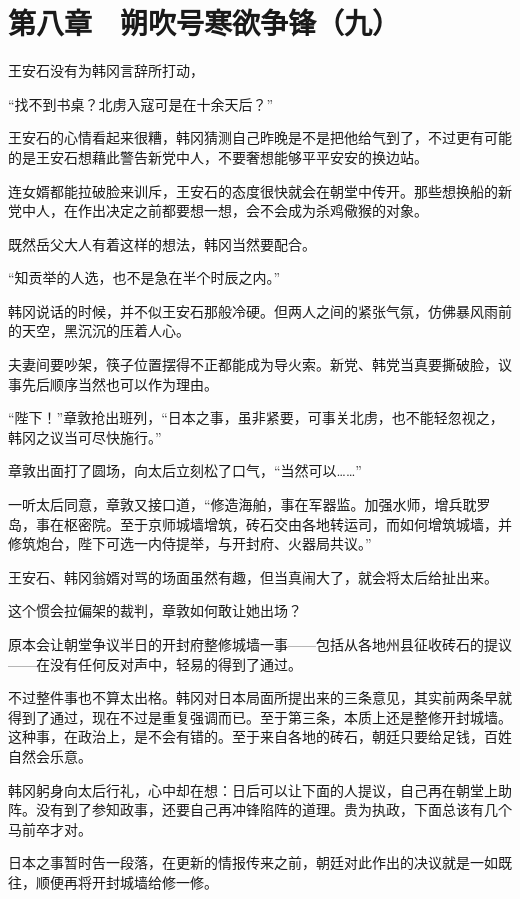\section{第八章　朔吹号寒欲争锋（九）}

王安石没有为韩冈言辞所打动，

“找不到书桌？北虏入寇可是在十余天后？”

王安石的心情看起来很糟，韩冈猜测自己昨晚是不是把他给气到了，不过更有可能的是王安石想藉此警告新党中人，不要奢想能够平平安安的换边站。

连女婿都能拉破脸来训斥，王安石的态度很快就会在朝堂中传开。那些想换船的新党中人，在作出决定之前都要想一想，会不会成为杀鸡儆猴的对象。

既然岳父大人有着这样的想法，韩冈当然要配合。

“知贡举的人选，也不是急在半个时辰之内。”

韩冈说话的时候，并不似王安石那般冷硬。但两人之间的紧张气氛，仿佛暴风雨前的天空，黑沉沉的压着人心。

夫妻间要吵架，筷子位置摆得不正都能成为导火索。新党、韩党当真要撕破脸，议事先后顺序当然也可以作为理由。

“陛下！”章敦抢出班列，“日本之事，虽非紧要，可事关北虏，也不能轻忽视之，韩冈之议当可尽快施行。”

章敦出面打了圆场，向太后立刻松了口气，“当然可以……”

一听太后同意，章敦又接口道，“修造海舶，事在军器监。加强水师，增兵耽罗岛，事在枢密院。至于京师城墙增筑，砖石交由各地转运司，而如何增筑城墙，并修筑炮台，陛下可选一内侍提举，与开封府、火器局共议。”

王安石、韩冈翁婿对骂的场面虽然有趣，但当真闹大了，就会将太后给扯出来。

这个惯会拉偏架的裁判，章敦如何敢让她出场？

原本会让朝堂争议半日的开封府整修城墙一事——包括从各地州县征收砖石的提议——在没有任何反对声中，轻易的得到了通过。

不过整件事也不算太出格。韩冈对日本局面所提出来的三条意见，其实前两条早就得到了通过，现在不过是重复强调而已。至于第三条，本质上还是整修开封城墙。这种事，在政治上，是不会有错的。至于来自各地的砖石，朝廷只要给足钱，百姓自然会乐意。

韩冈躬身向太后行礼，心中却在想：日后可以让下面的人提议，自己再在朝堂上助阵。没有到了参知政事，还要自己再冲锋陷阵的道理。贵为执政，下面总该有几个马前卒才对。

日本之事暂时告一段落，在更新的情报传来之前，朝廷对此作出的决议就是一如既往，顺便再将开封城墙给修一修。


